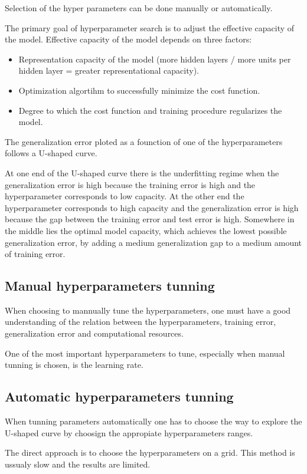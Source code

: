 \documentclass{tufte-handout}
\begin{document}
Selection of the hyper parameters can be done manually or automatically.

The primary goal of hyperparameter search is to adjust the effective capacity of the
model. Effective capacity of the model depends on three factors:
\begin{itemize}
    \item Representation capacity of the model (more hidden layers / more units per
        hidden layer = greater representational capacity).
    \item Optimization algortihm to successfully minimize the cost function.
    \item Degree to which the cost function and training procedure regularizes the
        model.
\end{itemize}

The generalization error ploted as a founction of one of the hyperparameters
follows a U-shaped curve.

At one end of the U-shaped curve there is the underfitting regime when the
generalization error is high because the training error is high and the
hyperparameter corresponds to low capacity. At the other end the hyperparameter
corresponds to high capacity and the generalization error is high because the
gap between the training error and test error is high. Somewhere in the middle lies
the optimal model capacity, which achieves the lowest possible generalization error,
by adding a medium generalization gap to a medium amount of training error.

\subsection{Manual hyperparameters tunning}
When choosing to mannually tune the hyperparameters, one must have a good
understanding of the relation between the hyperparameters, training error,
generalization error and computational resources.

One of the most important hyperparameters to tune, especially when manual tunning
is chosen, is the learning rate.

\subsection{Automatic hyperparameters tunning}
When tunning parameters automatically one has to choose the way to explore the
U-shaped curve by choosign the appropiate hyperparameters ranges.

The direct approach is to choose the hyperparameters on a grid. This method is
ussualy slow and the results are limited.
\end{document}
